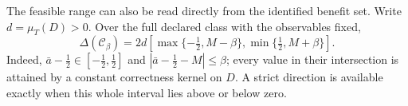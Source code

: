 \noindent The feasible range can also be read directly from the identified benefit set. Write
$d=\mu_T(D)>0$. Over the full declared class with the observables fixed,
\[
 \Delta(\mathcal C_\beta)
 =2d\left[\max\{-\tfrac12,M-\beta\},
          \min\{\tfrac12,M+\beta\}\right].
\]
Indeed, $\bar a-\tfrac12\in[-\tfrac12,\tfrac12]$ and
$|\bar a-\tfrac12-M|\le\beta$; every value in their intersection is attained by a constant
correctness kernel on $D$. A strict direction is available exactly when this whole interval
lies above or below zero.

